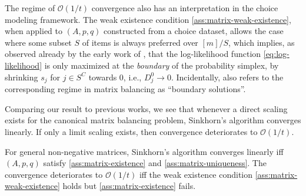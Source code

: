 The regime of $\mathcal O(1/t)$ convergence also has an interpretation in the choice modeling framework. The weak existence condition \cref{ass:matrix-weak-existence}, when applied to $(A,p,q)$ constructed from a choice dataset, allows the case where some subset $S$ of items is always preferred over $[m]/S$, which implies, as observed already by the early work of \citet{ford1957solution}, that the log-likelihood function \eqref{eq:log-likelihood} is only maximized at the \emph{boundary} of the probability simplex, by shrinking  $s_j$ for $j\in S^C$ towards 0, i.e., $D^0_j \rightarrow 0$. Incidentally, \citet{bacharach1965estimating} also refers to the corresponding regime in matrix balancing as ``boundary solutions''. 

Comparing our result to previous works, we see that whenever a direct scaling exists for the canonical matrix balancing problem, Sinkhorn's algorithm converges linearly. If only a limit scaling exists, then convergence deteriorates to 
$\mathcal O(1/t)$.
\begin{corollary}
       For general non-negative matrices, Sinkhorn's algorithm converges linearly
iff $(A,p,q)$ satisfy \cref{ass:matrix-existence} and \cref{ass:matrix-uniqueness}. The convergence deteriorates to $\mathcal O(1/t)$ iff the weak existence condition \cref{ass:matrix-weak-existence} holds but \cref{ass:matrix-existence} fails.
   \end{corollary}



